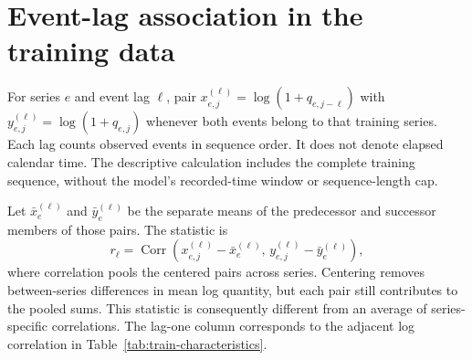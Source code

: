 \documentclass[runningheads]{llncs}
\begin{document}
\section{Event-lag association in the training data}
\label{app:lag}
For series $e$ and event lag $\ell$, pair
$x^{(\ell)}_{e,j}=\log(1+q_{e,j-\ell})$ with
$y^{(\ell)}_{e,j}=\log(1+q_{e,j})$ whenever both events belong to that
training series. Each lag counts observed events in sequence order.
It does not denote elapsed calendar time. The descriptive calculation
includes the complete training sequence, without the model's recorded-time
window or sequence-length cap.

Let $\bar x_e^{(\ell)}$ and $\bar y_e^{(\ell)}$ be the separate means
of the predecessor and successor members of those pairs. The statistic is
\begin{equation}
 r_{\ell}=\operatorname{Corr}\!\left(
 x^{(\ell)}_{e,j}-\bar x_e^{(\ell)},\,
 y^{(\ell)}_{e,j}-\bar y_e^{(\ell)}\right),
 \label{eq:train-lag-correlation}
\end{equation}
where correlation pools the centered pairs across series. Centering removes
between-series differences in mean log quantity, but each pair still
contributes to the pooled sums. This statistic is consequently different
from an average of series-specific correlations. The lag-one column
corresponds to the adjacent log correlation in
Table~\ref{tab:train-characteristics}.
\end{document}
